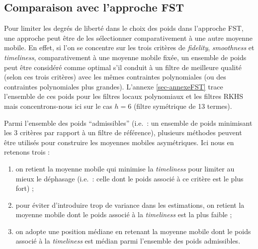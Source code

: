 \documentclass[
  11pt,
  french,
  a4paper]{article}
\newcommand\1{\mathds{1}}
\begin{document}
\hypertarget{comparaison-avec-lapproche-fst}{%
\subsection{Comparaison avec l'approche FST}\label{comparaison-avec-lapproche-fst}}

Pour limiter les degrés de liberté dans le choix des poids dans l'approche FST, une approche peut être de les sélectionner comparativement à une autre moyenne mobile.
En effet, si l'on se concentre sur les trois critères de \emph{fidelity}, \emph{smoothness} et \emph{timeliness}, comparativement à une moyenne mobile fixée, un ensemble de poids peut être considéré comme optimal s'il conduit à un filtre de meilleure qualité (selon ces trois critères) avec les mêmes contraintes polynomiales (ou des contraintes polynomiales plus grandes).
L'annexe \ref{sec-annexeFST} trace l'ensemble de ces poids pour les filtres locaux polynomiaux et les filtres RKHS mais concentrons-nous ici sur le cas \(h=6\) (filtre symétrique de 13 termes).

Parmi l'ensemble des poids ``admissibles'' (i.e.~: un ensemble de poids minimisant les 3 critères par rapport à un filtre de référence), plusieurs méthodes peuvent être utilisés pour construire les moyennes mobiles asymétriques.
Ici nous en retenons trois :

\begin{enumerate}
\def\labelenumi{\arabic{enumi}.}
\item
  on retient la moyenne mobile qui minimise la \emph{timeliness} pour limiter au mieux le déphasage (i.e.~: celle dont le poids associé à ce critère est le plus fort) ;
\item
  pour éviter d'introduire trop de variance dans les estimations, on retient la moyenne mobile dont le poids associé à la \emph{timeliness} est la plus faible ;
\item
  on adopte une position médiane en retenant la moyenne mobile dont le poids associé à la \emph{timeliness} est médian parmi l'ensemble des poids admissibles.
\end{enumerate}
\end{document}
